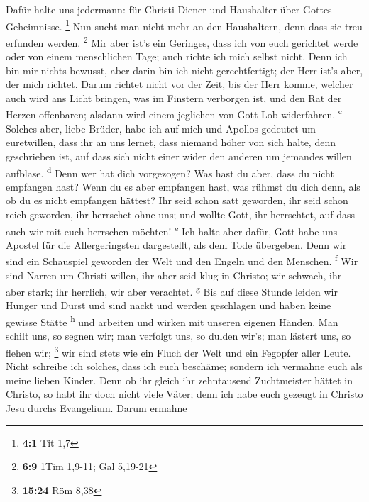  Dafür halte uns jedermann: für Christi Diener und
Haushalter über Gottes Geheimnisse. \footnote{\textbf{4:1} Tit 1,7}
 Nun sucht man nicht mehr an den Haushaltern, denn dass
sie treu erfunden werden. \footnote{\textbf{6:9} 1Tim 1,9-11; Gal
  5,19-21}  Mir aber ist's ein Geringes, dass ich von euch
gerichtet werde oder von einem menschlichen Tage; auch richte ich mich
selbst nicht.  Denn ich bin mir nichts bewusst, aber darin
bin ich nicht gerechtfertigt; der Herr ist's aber, der mich richtet.
 Darum richtet nicht vor der Zeit, bis der Herr komme,
welcher auch wird ans Licht bringen, was im Finstern verborgen ist, und
den Rat der Herzen offenbaren; alsdann wird einem jeglichen von Gott Lob
widerfahren. \textsuperscript{c}  Solches aber, liebe
Brüder, habe ich auf mich und Apollos gedeutet um euretwillen, dass ihr
an uns lernet, dass niemand höher von sich halte, denn geschrieben ist,
auf dass sich nicht einer wider den anderen um jemandes willen aufblase.
\textsuperscript{d}  Denn wer hat dich vorgezogen? Was
hast du aber, dass du nicht empfangen hast? Wenn du es aber empfangen
hast, was rühmst du dich denn, als ob du es nicht empfangen hättest?
 Ihr seid schon satt geworden, ihr seid schon reich
geworden, ihr herrschet ohne uns; und wollte Gott, ihr herrschtet, auf
dass auch wir mit euch herrschen möchten! \textsuperscript{e}
 Ich halte aber dafür, Gott habe uns Apostel für die
Allergeringsten dargestellt, als dem Tode übergeben. Denn wir sind ein
Schauspiel geworden der Welt und den Engeln und den Menschen.
\textsuperscript{f}  Wir sind Narren um Christi willen,
ihr aber seid klug in Christo; wir schwach, ihr aber stark; ihr
herrlich, wir aber verachtet. \textsuperscript{g}  Bis
auf diese Stunde leiden wir Hunger und Durst und sind nackt und werden
geschlagen und haben keine gewisse Stätte \textsuperscript{h}
 und arbeiten und wirken mit unseren eigenen Händen. Man
schilt uns, so segnen wir; man verfolgt uns, so dulden wir's; man
lästert uns, so flehen wir; \footnote{\textbf{15:24} Röm 8,38}
 wir sind stets wie ein Fluch der Welt und ein Fegopfer
aller Leute.  Nicht schreibe ich solches, dass ich euch
beschäme; sondern ich vermahne euch als meine lieben Kinder.
 Denn ob ihr gleich ihr zehntausend Zuchtmeister hättet
in Christo, so habt ihr doch nicht viele Väter; denn ich habe euch
gezeugt in Christo Jesu durchs Evangelium.  Darum ermahne
